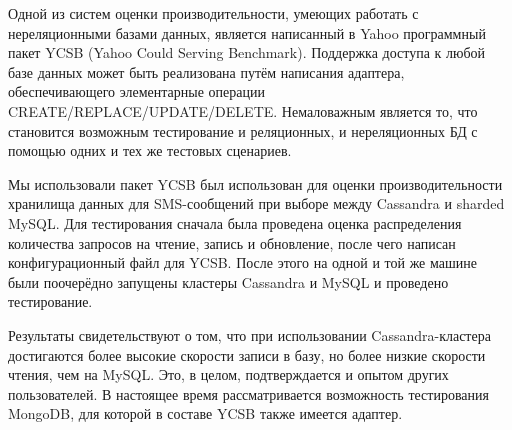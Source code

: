 \documentclass[10pt, a5paper]{article}
\begin{document}
Одной из систем оценки производительности, умеющих работать с
нереляционными базами данных, является написанный в Yahoo программный
пакет YCSB (Yahoo Could Serving Benchmark). Поддержка доступа к любой
базе данных может быть реализована путём написания адаптера,
обеспечивающего элементарные операции CREATE/REPLACE/UPDATE/DELETE.
Немаловажным является то, что становится возможным тестирование и
реляционных, и нереляционных БД с помощью одних и тех же тестовых сценариев.

Мы использовали пакет YCSB был использован для оценки
производительности хранилища данных для SMS-сообщений при выборе между
Cassandra и sharded MySQL. Для тестирования сначала была проведена
оценка распределения количества запросов на чтение, запись и обновление,
после чего написан конфигурационный файл для YCSB. После этого на одной
и той же машине были поочерёдно запущены кластеры Cassandra и MySQL и
проведено тестирование.

Результаты свидетельствуют о том, что при использовании
Cassandra-кластера достигаются более высокие скорости записи в базу, но
более низкие скорости чтения, чем на MySQL. Это, в целом, подтверждается
и опытом других пользователей. В настоящее время рассматривается
возможность тестирования MongoDB, для которой в составе YCSB также
имеется адаптер.
\end{document}
